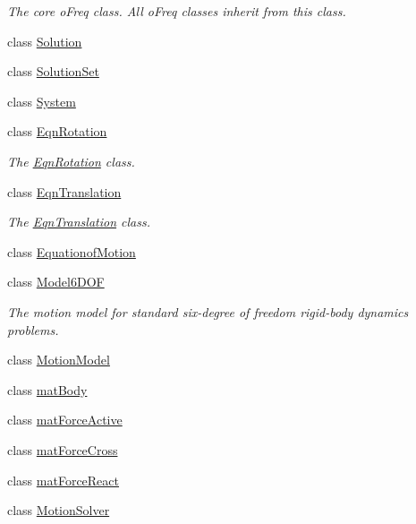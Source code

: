 \begin{DoxyCompactItemize}
\begin{DoxyCompactList}\small\item\em The core o\-Freq class. All o\-Freq classes inherit from this class. \end{DoxyCompactList}\item 
class \hyperlink{classosea_1_1ofreq_1_1_solution}{Solution}
\item 
class \hyperlink{classosea_1_1ofreq_1_1_solution_set}{Solution\-Set}
\item 
class \hyperlink{classosea_1_1ofreq_1_1_system}{System}
\item 
class \hyperlink{classosea_1_1ofreq_1_1_eqn_rotation}{Eqn\-Rotation}
\begin{DoxyCompactList}\small\item\em The \hyperlink{classosea_1_1ofreq_1_1_eqn_rotation}{Eqn\-Rotation} class. \end{DoxyCompactList}\item 
class \hyperlink{classosea_1_1ofreq_1_1_eqn_translation}{Eqn\-Translation}
\begin{DoxyCompactList}\small\item\em The \hyperlink{classosea_1_1ofreq_1_1_eqn_translation}{Eqn\-Translation} class. \end{DoxyCompactList}\item 
class \hyperlink{classosea_1_1ofreq_1_1_equationof_motion}{Equationof\-Motion}
\item 
class \hyperlink{classosea_1_1ofreq_1_1_model6_d_o_f}{Model6\-D\-O\-F}
\begin{DoxyCompactList}\small\item\em The motion model for standard six-\/degree of freedom rigid-\/body dynamics problems. \end{DoxyCompactList}\item 
class \hyperlink{classosea_1_1ofreq_1_1_motion_model}{Motion\-Model}
\item 
class \hyperlink{classosea_1_1ofreq_1_1mat_body}{mat\-Body}
\item 
class \hyperlink{classosea_1_1ofreq_1_1mat_force_active}{mat\-Force\-Active}
\item 
class \hyperlink{classosea_1_1ofreq_1_1mat_force_cross}{mat\-Force\-Cross}
\item 
class \hyperlink{classosea_1_1ofreq_1_1mat_force_react}{mat\-Force\-React}
\item 
class \hyperlink{classosea_1_1ofreq_1_1_motion_solver}{Motion\-Solver}
\end{DoxyCompactItemize}
